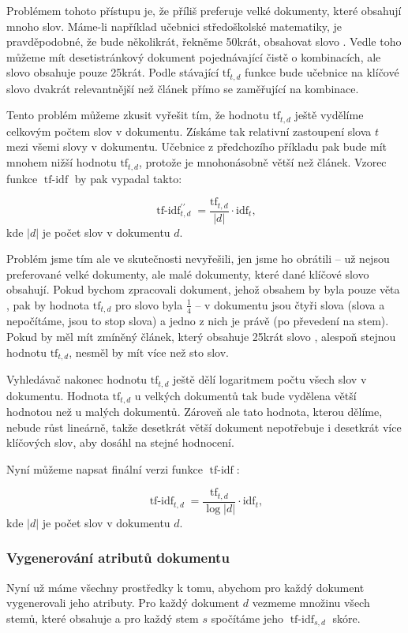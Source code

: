 \documentclass[12pt]{article}
\newcommand{\sssection}[1]{\subsubsection{#1}}
\DeclareMathOperator{\tfidf}{tf-idf}
\begin{document}
Problémem tohoto přístupu je, že příliš preferuje velké dokumenty, které obsahují mnoho slov. Máme-li například učebnici středoškolské matematiky, je pravděpodobné, že bude několikrát, řekněme 50krát, obsahovat slovo . Vedle toho můžeme mít desetistránkový dokument pojednávající čistě o kombinacích, ale slovo  obsahuje pouze 25krát. Podle stávající $\mbox{tf}_{t,d}$ funkce bude učebnice na klíčové slovo  dvakrát relevantnější než článek přímo se zaměřující na kombinace. 

Tento problém můžeme zkusit vyřešit tím, že hodnotu $\mbox{tf}_{t,d}$ ještě vydělíme celkovým počtem slov v dokumentu. Získáme tak relativní zastoupení slova $t$ mezi všemi slovy v dokumentu. Učebnice z předchozího příkladu pak bude mít mnohem nižší hodnotu $\mbox{tf}_{t,d}$, protože je mnohonásobně větší než článek. Vzorec funkce $\tfidf$ by pak vypadal takto:

$$
\tfidf_{t,d}^{\prime\prime} = \frac{\mbox{tf}_{t,d}}{|d|}\cdot\mbox{idf}_t,
$$
kde $|d|$ je počet slov v dokumentu $d$.

Problém jsme tím ale ve skutečnosti nevyřešili, jen jsme ho obrátili -- už nejsou preferované velké dokumenty, ale malé dokumenty, které dané klíčové slovo obsahují. Pokud bychom zpracovali dokument, jehož obsahem by byla pouze věta , pak by hodnota $\mbox{tf}_{t,d}$ pro slovo  byla $\frac14$ -- v dokumentu jsou čtyři slova (slova  a  nepočítáme, jsou to stop slova) a jedno z nich je právě  (po převedení na stem). Pokud by měl mít zmíněný článek, který obsahuje 25krát slovo , alespoň stejnou hodnotu $\mbox{tf}_{t,d}$, nesměl by mít více než sto slov. 

Vyhledávač nakonec hodnotu $\mbox{tf}_{t,d}$ ještě dělí logaritmem počtu všech slov v dokumentu. Hodnota $\mbox{tf}_{t,d}$ u velkých dokumentů tak bude vydělena větší hodnotou než u malých dokumentů. Zároveň ale tato hodnota, kterou dělíme, nebude růst lineárně, takže desetkrát větší dokument nepotřebuje i desetkrát více klíčových slov, aby dosáhl na stejné hodnocení.

Nyní můžeme napsat finální verzi funkce $\tfidf$:

$$
\tfidf_{t,d} = \frac{\mbox{tf}_{t,d}}{\log |d|}\cdot\mbox{idf}_t,
$$
kde $|d|$ je počet slov v dokumentu $d$.

\sssection{Vygenerování atributů dokumentu}

Nyní už máme všechny prostředky k tomu, abychom pro každý dokument vygenerovali jeho atributy. Pro každý dokument $d$ vezmeme množinu všech stemů, které obsahuje a pro každý stem $s$ spočítáme jeho $\tfidf_{s,d}$ skóre. 
\end{document}
